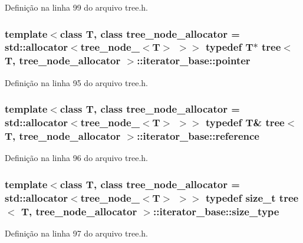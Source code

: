 Definição na linha 99 do arquivo tree.\+h.

\subsubsection[{pointer}]{\setlength{\rightskip}{0pt plus 5cm}template$<$class T, class tree\+\_\+node\+\_\+allocator = std\+::allocator$<$tree\+\_\+node\+\_\+$<$\+T$>$ $>$$>$ typedef T$\ast$ {\bf tree}$<$ T, tree\+\_\+node\+\_\+allocator $>$\+::{\bf iterator\+\_\+base\+::pointer}}\label{classtree_1_1iterator__base_a0665bed45269b6f7b97809ea9920008e}


Definição na linha 95 do arquivo tree.\+h.

\subsubsection[{reference}]{\setlength{\rightskip}{0pt plus 5cm}template$<$class T, class tree\+\_\+node\+\_\+allocator = std\+::allocator$<$tree\+\_\+node\+\_\+$<$\+T$>$ $>$$>$ typedef T\& {\bf tree}$<$ T, tree\+\_\+node\+\_\+allocator $>$\+::{\bf iterator\+\_\+base\+::reference}}\label{classtree_1_1iterator__base_a063faf883017de195e7e72cf55be6914}


Definição na linha 96 do arquivo tree.\+h.

\subsubsection[{size\+\_\+type}]{\setlength{\rightskip}{0pt plus 5cm}template$<$class T, class tree\+\_\+node\+\_\+allocator = std\+::allocator$<$tree\+\_\+node\+\_\+$<$\+T$>$ $>$$>$ typedef size\+\_\+t {\bf tree}$<$ T, tree\+\_\+node\+\_\+allocator $>$\+::{\bf iterator\+\_\+base\+::size\+\_\+type}}\label{classtree_1_1iterator__base_aa2b239ac4db713d5b191e696584a9076}


Definição na linha 97 do arquivo tree.\+h.

